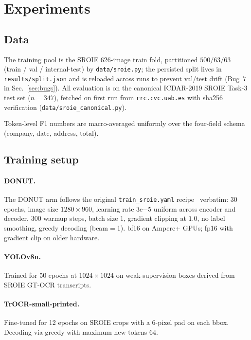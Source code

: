 \section{Experiments}
\label{sec:experiments}

\subsection{Data}

The training pool is the SROIE 626-image train fold, partitioned
$500/63/63$ (train / val / internal-test) by
\texttt{data/sroie.py}; the persisted split lives in
\texttt{results/split.json} and is reloaded across runs to prevent
val/test drift (Bug~7 in Sec.~\ref{sec:bugs}).  All evaluation is
on the canonical ICDAR-2019 SROIE Task-3 test set ($n=347$),
fetched on first run from \texttt{rrc.cvc.uab.es} with sha256
verification (\texttt{data/sroie\_canonical.py}).

Token-level F1 numbers are macro-averaged uniformly over the
four-field schema (\textsf{company}, \textsf{date},
\textsf{address}, \textsf{total}).

\subsection{Training setup}

\paragraph{DONUT.}  The DONUT arm follows the original
\texttt{train\_sroie.yaml} recipe~\cite{kim2022donut} verbatim:
30 epochs, image size $1280\times960$, learning rate
$3\mathrm{e}{-5}$ uniform across encoder and decoder, $300$ warmup
steps, batch size 1, gradient clipping at $1.0$, no label smoothing,
greedy decoding (beam$=$1).  bf16 on Ampere+ GPUs; fp16 with
gradient clip on older hardware.

\paragraph{YOLOv8n.}  Trained for 50 epochs at $1024\times 1024$ on
weak-supervision boxes derived from SROIE GT-OCR transcripts.

\paragraph{TrOCR-small-printed.}  Fine-tuned for 12 epochs on SROIE
crops with a 6-pixel pad on each bbox.  Decoding via greedy with
maximum new tokens $64$.

